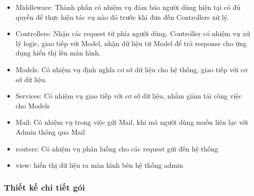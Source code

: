 \documentclass{article}
\begin{document}
\begin{itemize}
    \item Middleware: Thành phần có nhiệm vụ đảm bảo người dùng hiện tại có đủ quyền để thực hiện tác vụ nào đó trước khi đưa đến Controllers xử lý.
    \item Controllers: Nhận các request từ phía người dùng. Controller có nhiệm vụ xử lý logic, giao tiếp với Model, nhận dữ liệu từ Model để trả response cho ứng dụng hiển thị lên màn hình.
    \item Models: Có nhiệm vụ định nghĩa cơ sở dữ liệu cho hệ thống, giao tiếp với cơ sở dữ liệu.
    \item Services: Có nhiệm vụ giao tiếp với cơ sở dữ liệu, nhằm giảm tải công việc cho Models
    \item Mail: Có nhiệm vụ trong việc gửi Mail, khi mà người dùng muốn liên lạc với Admin thông qua Mail
    \item routers: Có nhiệm vụ phân luồng cho các request gửi đến hệ thống
    \item view: hiển thị dữ liệu ra màn hình bên hệ thống admin
\end{itemize}
\subsubsection{Thiết kế chi tiết gói}
\end{document}
